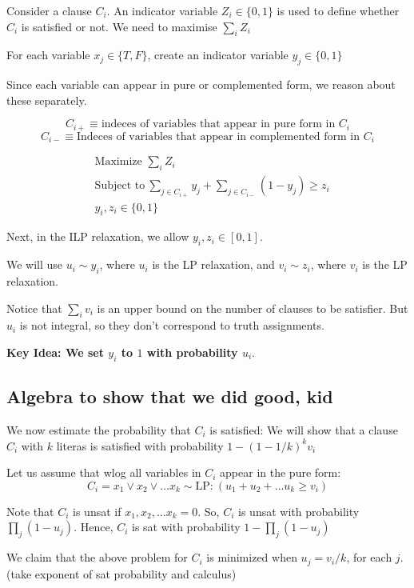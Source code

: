 Consider a clause $C_i$. An indicator variable $Z_i \in \{0, 1\}$ is used to define
whether $C_i$ is satisfied or not. We need to maximise $\sum_i Z_i$

For each variable $x_j \in \{T, F\}$, create an indicator variable $y_j \in \{0, 1\}$

Since each variable can appear in pure or complemented form, we reason about these
separately. 

$$C_{i+} \equiv \text{indeces of variables that appear in pure form in $C_i$}$$
$$C_{i-} \equiv \text{Indeces of variables that appear in complemented form in $C_i$}$$

\begin{align*}
    &\text{Maximize $\sum_i Z_i$} \\
    &\text{Subject to}~\sum_{j \in C_{i+}} y_j + \sum_{j \in C_{i-}} (1 - y_j) \geq z_i \\
    &y_i, z_i \in \{0, 1\}
\end{align*}

Next, in the ILP relaxation, we allow $y_i, z_i \in [0, 1]$.

We will use $u_i \sim y_i$, where $u_i$ is the LP relaxation, and $v_i \sim z_i$, where
$v_i$ is the LP relaxation.

Notice that $\sum_i v_i$ is an upper bound on the number of clauses to be
satisfier. But $u_i$ is not integral, so they don't correspond to truth assignments.

\textbf{Key Idea: We set $y_i$ to $1$ with probability $u_i$}.


\subsection{Algebra to show that we did good, kid}
We now estimate the probability that $C_i$ is satisfied: We will show that a clause $C_i$
with $k$ literas is satisfied with probability $1 - (1 - 1/k)^k v_i$


Let us assume that wlog all variables in $C_i$ appear in the pure form:
$$
C_i = x_1 \lor x_2 \lor \dots x_k \sim \text{LP:}~ (u_1 + u_2 + \dots u_k \geq v_i)
$$

Note that $C_i$ is unsat if $x_1, x_2, \dots x_k = 0$. So, $C_i$ is unsat with
probability $\prod_j (1 - u_j)$. Hence, $C_i$ is sat with probability $1 - \prod_j (1 - u_j)$


We claim that the above problem for $C_i$ is minimized when $u_j = v_i/k$, for each $j$.
(take exponent of sat probability and calculus)

